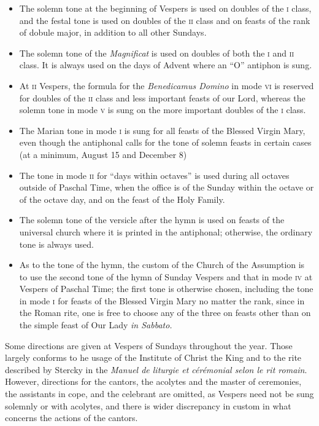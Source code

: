 \begin{enpars}
\begin{itemize}
 \item The solemn tone at the beginning of Vespers is used on doubles of the \textsc{i} class, and the festal tone is used on doubles of the \textsc{ii} class and on feasts of the rank of dobule major, in addition to all other Sundays.
 \item The solemn tone of the \textit{Ma\-gnificat} is used on doubles of both the \textsc{i} and \textsc{ii} class. It is always used on the days of Advent where an ``O'' antiphon is sung.
 \item  At \textsc{ii} Vespers, the formula for the \textit{Benedicamus Domino} in mode \textsc{vi} is reserved for doubles of the \textsc{ii} class and less important feasts of our Lord, whereas the solemn tone in mode \textsc{v} is sung on the more important doubles of the \textsc{i} class. 
 \item
 The Marian tone in mode \textsc{i} is sung for all feasts of the Blessed Virgin Mary, even though the antiphonal calls for the tone of solemn feasts in certain cases (at a minimum, August 15 and December 8)
 \item
 The tone in mode \textsc{ii} for ``days within octaves'' is used during all octaves outside of Paschal Time, when the office is of the Sunday within the octave or of the octave day, and on the feast of the Holy Family.
 \item
 The solemn tone of the versicle after the hymn is used on feasts of the universal church where it is printed in the antiphonal; otherwise, the ordinary tone is always used.
 \item As to the tone of the hymn, the custom of the Church of the Assumption is to use the second tone of the hymn of Sunday Vespers and that in mode \textsc{iv} at Vespers of Paschal Time; the first tone is otherwise chosen, including the tone in mode \textsc{i} for feasts of the Blessed Virgin Mary no matter the rank, since in the Roman rite, one is free to choose any of the three on feasts other than on the simple feast of Our Lady \textit{in Sabbato.}
\end{itemize}

Some directions are given at Vespers of Sundays throughout the year. Those largely conforms to he usage of the Institute of Christ the King and to the rite described by Stercky in the \textit{Manuel de liturgie et cérémonial selon le rit romain}. However, directions for the cantors, the acolytes and the master of ceremonies, the assistants in cope, and the celebrant are omitted, as Vespers need not be sung solemnly or with acolytes, and there is wider discrepancy in custom in what concerns the actions of the cantors.


\end{enpars}
